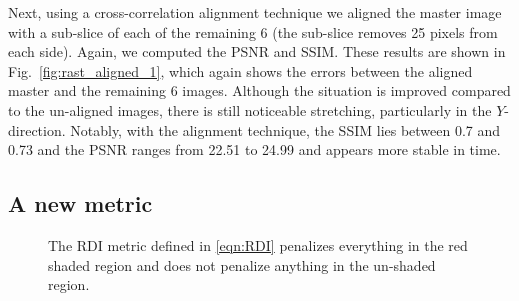 \documentclass[twocolumn,oneside]{IEEEtran/IEEEtran}
\begin{document}
Next, using a cross-correlation alignment technique
we aligned the master image with a sub-slice of each of
the remaining 6 (the sub-slice removes 25 pixels from each side). Again, we
computed the PSNR and SSIM. These results are shown in
Fig.~\ref{fig:rast_aligned_1}, which again shows the errors between the
aligned master and the remaining 6 images. Although the situation is improved
compared to the un-aligned images, there is still noticeable stretching,
particularly in the $Y$-direction. Notably, with the alignment technique,
the SSIM lies between 0.7 and 0.73 and the PSNR ranges from 22.51 to 24.99 and appears more stable in time.





\subsection{A new metric}
\begin{figure}[t!]
  \centering
  
  \caption{The RDI metric defined in \eqref{eqn:RDI} penalizes everything in the
    red shaded region and does not penalize anything in the un-shaded region.}
  \label{fig:damage_illustrate}
\end{figure}
\end{document}
